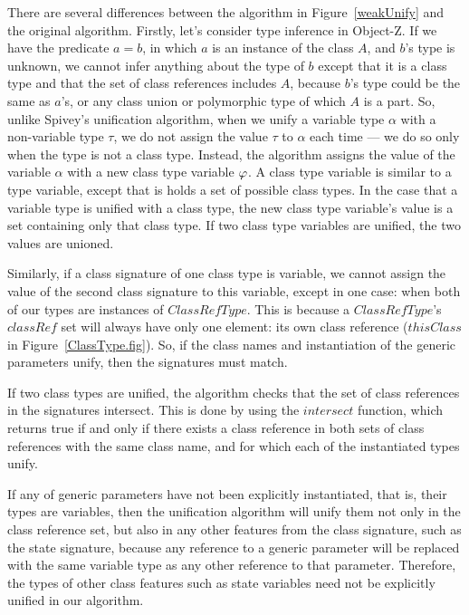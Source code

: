 There are several differences between the algorithm in
Figure~\ref{weakUnify} and the original algorithm. Firstly, let's
consider type inference in Object-Z. If we have the predicate $a = b$,
in which $a$ is an instance of the class $A$, and $b$'s type is
unknown, we cannot infer anything about the type of $b$ except that it
is a class type and that the set of class references includes $A$,
because $b$'s type could be the same as $a$'s, or any class union or
polymorphic type of which $A$ is a part. So, unlike Spivey's
unification algorithm, when we unify a variable type $\alpha$ with a
non-variable type $\tau$, we do not assign the value $\tau$ to
$\alpha$ each time --- we do so only when the type is not a class
type. Instead, the algorithm assigns the value of the variable
$\alpha$ with a new class type variable $\varphi$. A class type
variable is similar to a type variable, except that is holds a set of
possible class types. In the case that a variable type is unified with
a class type, the new class type variable's value is a set containing
only that class type. If two class type variables are unified, the two
values are unioned.
  
Similarly, if a class signature of one class type is variable, we
cannot assign the value of the second class signature to this
variable, except in one case: when both of our types are instances of
$ClassRefType$. This is because a $ClassRefType$'s $classRef$ set will
always have only one element: its own class reference ($thisClass$ in
Figure~\ref{ClassType.fig}). So, if the class names and instantiation
of the generic parameters unify, then the signatures must match.

If two class types are unified, the algorithm checks that the set of
class references in the signatures intersect. This is done by using
the $intersect$ function, which returns true if and only if
there exists a class reference in both sets of class references with
the same class name, and for which each of the instantiated types
unify.

If any of generic parameters have not been explicitly instantiated,
that is, their types are variables, then the unification algorithm
will unify them not only in the class reference set, but also in any
other features from the class signature, such as the state signature,
because any reference to a generic parameter will be replaced with the
same variable type as any other reference to that
parameter. Therefore, the types of other class features such as state
variables need not be explicitly unified in our algorithm.

